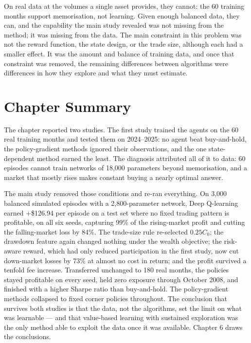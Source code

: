 On real data at the volumes a single asset provides, they cannot: the 60
training months support memorisation, not learning. Given enough
balanced data, they can, and the capability the main study revealed was
not missing from the method; it was missing from the data. The main
constraint in this problem was not the reward function, the state
design, or the trade size, although each had a smaller effect. It was
the amount and balance of training data, and once that constraint was
removed, the remaining differences between algorithms were differences
in how they explore and what they must estimate.

\section{Chapter Summary}

The chapter reported two studies. The first study trained the
agents on the 60 real training months and tested them on 2024--2025: no
agent beat buy-and-hold, the policy-gradient methods ignored their
observations, and the one state-dependent method earned the least. The
diagnosis attributed all of it to data: 60 episodes cannot train
networks of 18,000 parameters beyond memorisation, and a market that
mostly rises makes constant buying a nearly optimal answer.

The main study removed those conditions and re-ran everything. On 3,000
balanced simulated episodes with a 2,800-parameter network, Deep
Q-learning earned +\$126.94 per episode on a test set where no fixed
trading pattern is profitable, on all six seeds, capturing 99\% of the
rising-market profit and cutting the falling-market loss by 84\%. The
trade-size rule re-selected \(0.25C_{0}\); the drawdown feature again
changed nothing under the wealth objective; the risk-aware reward, which
had only reduced participation in the first study, now cut down-market losses
by 73\% at almost no cost in return; and the profit survived a
tenfold fee increase. Transferred unchanged to 180 real months, the
policies stayed profitable on every seed, held zero exposure through
October 2008, and finished with a higher Sharpe ratio than buy-and-hold.
The policy-gradient methods collapsed to fixed corner policies
throughout. The conclusion that survives both studies is that the data,
not the algorithms, set the limit on what was learnable --- and that
value-based learning with sustained exploration was the only method able
to exploit the data once it was available. Chapter 6 draws the
conclusions.
